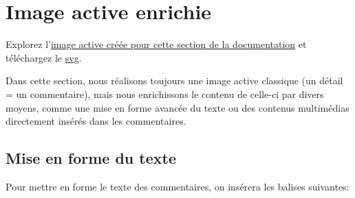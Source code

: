 {\section{Image active enrichie}

Explorez l'\href{http://geoffrey-gekiere.ac-versailles.fr/xia2}{image active créée pour cette section de la documentation} 
et téléchargez le \href{http://geoffrey-gekiere.ac-versailles.fr/xia2/svg/xia2.svg}{svg}.

Dans cette section, nous réalisons toujours une image active classique (un détail = un commentaire),
mais nous enrichissons le contenu de celle-ci par divers moyens, comme une mise en forme avancée du texte ou des contenus 
multimédias directement insérés dans les commentaires.

\subsection{Mise en forme du texte}

Pour mettre en forme le texte des commentaires, on insérera les balises suivantes:

}
